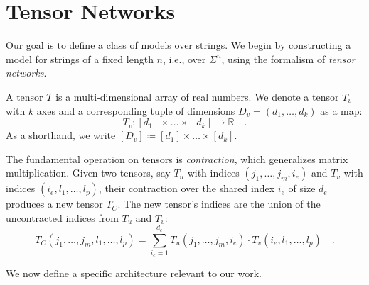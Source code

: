 \documentclass[../../main.tex]{subfiles}
\begin{document}





\section{Tensor Networks}
\label{section:tensor_networks}
Our goal is to define a class of models over strings. We begin by constructing a model for strings of a fixed length \( n \), i.e., over \( \Sigma^n \), using the formalism of \emph{tensor networks}.

\bigskip
A tensor \( T \) is a multi-dimensional array of real numbers. We denote a tensor \( T_v \) with \( k \) axes and a corresponding tuple of dimensions \( D_v = (d_1, \dots, d_k) \) as a map:
\[
T_v : [d_1] \times \dots \times [d_k] \to \mathbb{R} \quad .
\]
As a shorthand, we write \( [D_v] \coloneqq [d_1] \times \dots \times [d_k] \).

The fundamental operation on tensors is \emph{contraction}, which generalizes matrix multiplication. Given two tensors, say \( T_u \) with indices \( (j_1, \dots, j_m, i_e) \) and \( T_v \) with indices \( (i_e, l_1, \dots, l_p) \), their contraction over the shared index \( i_e \) of size \( d_e \) produces a new tensor \( T_C \). The new tensor's indices are the union of the uncontracted indices from \( T_u \) and \( T_v \):
\[
T_C(j_1, \dots, j_m, l_1, \dots, l_p) = \sum_{i_e=1}^{d_e} T_u(j_1, \dots, j_m, i_e) \cdot T_v(i_e, l_1, \dots, l_p) \quad .
\]

We now define a specific architecture relevant to our work.
\end{document}
